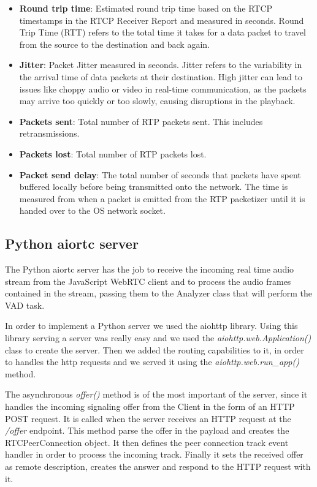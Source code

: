 \documentclass[../main.tex]{subfiles}
\begin{document}
\begin{itemize}
    \item \textbf{Round trip time}: Estimated round trip time based on the RTCP timestamps in the RTCP Receiver Report and measured in seconds. Round Trip Time (RTT) refers to the total time it takes for a data packet to travel from the source to the destination and back again.
    \item \textbf{Jitter}: Packet Jitter measured in seconds. Jitter refers to the variability in the arrival time of data packets at their destination. High jitter can lead to issues like choppy audio or video in real-time communication, as the packets may arrive too quickly or too slowly, causing disruptions in the playback.
    \item \textbf{Packets sent}: Total number of RTP packets sent. This includes retransmissions.
    \item \textbf{Packets lost}: Total number of RTP packets lost.
    \item \textbf{Packet send delay}: The total number of seconds that packets have spent buffered locally before being transmitted onto the network. The time is measured from when a packet is emitted from the RTP packetizer until it is handed over to the OS network socket.
\end{itemize}

\clearpage

\subsection{Python aiortc server}

The Python aiortc server has the job to receive the incoming real time audio stream from the JavaScript WebRTC client and to process the audio frames contained in the stream, passing them to the Analyzer class that will perform the VAD task. 

In order to implement a Python server we used the aiohttp library. Using this library serving a server was really easy and we used the \textit{aiohttp.web.Application()} class to create the server. Then we added the routing capabilities to it, in order to handles the http requests and we served it using the \textit{aiohttp.web.run\_app()} method. 

The asynchronous \textit{offer()} method is  of the most important of the server, since it handles the incoming signaling offer from the Client in the form of an HTTP POST request. It is called when the server receives an HTTP request at the \textit{/offer} endpoint. This method parse the offer in the payload and creates the RTCPeerConnection object. It then defines the peer connection track event handler in order to process the incoming track. Finally it sets the received offer as remote description, creates the answer and respond to the HTTP request with it.
\end{document}
